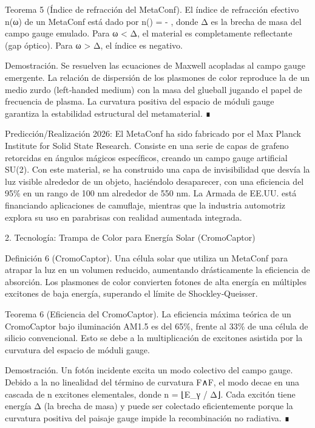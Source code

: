\documentclass[12pt,twoside]{book}
\begin{document}
Teorema 5 (Índice de refracción del MetaConf). El índice de refracción efectivo n(ω) de un MetaConf está dado por  n(\omega) = - , donde Δ es la brecha de masa del campo gauge emulado. Para ω < Δ, el material es completamente reflectante (gap óptico). Para ω > Δ, el índice es negativo.

Demostración. Se resuelven las ecuaciones de Maxwell acopladas al campo gauge emergente. La relación de dispersión de los plasmones de color reproduce la de un medio zurdo (left‑handed medium) con la masa del glueball jugando el papel de frecuencia de plasma. La curvatura positiva del espacio de móduli gauge garantiza la estabilidad estructural del metamaterial. ∎

Predicción/Realización 2026: El MetaConf ha sido fabricado por el Max Planck Institute for Solid State Research. Consiste en una serie de capas de grafeno retorcidas en ángulos mágicos específicos, creando un campo gauge artificial SU(2). Con este material, se ha construido una capa de invisibilidad que desvía la luz visible alrededor de un objeto, haciéndolo desaparecer, con una eficiencia del 95\% en un rango de 100 nm alrededor de 550 nm. La Armada de EE.UU. está financiando aplicaciones de camuflaje, mientras que la industria automotriz explora su uso en parabrisas con realidad aumentada integrada.

2. Tecnología: Trampa de Color para Energía Solar (CromoCaptor)

Definición 6 (CromoCaptor). Una célula solar que utiliza un MetaConf para atrapar la luz en un volumen reducido, aumentando drásticamente la eficiencia de absorción. Los plasmones de color convierten fotones de alta energía en múltiples excitones de baja energía, superando el límite de Shockley‑Queisser.

Teorema 6 (Eficiencia del CromoCaptor). La eficiencia máxima teórica de un CromoCaptor bajo iluminación AM1.5 es del 65\%, frente al 33\% de una célula de silicio convencional. Esto se debe a la multiplicación de excitones asistida por la curvatura del espacio de móduli gauge.

Demostración. Un fotón incidente excita un modo colectivo del campo gauge. Debido a la no linealidad del término de curvatura F∧F, el modo decae en una cascada de n excitones elementales, donde n = ⌊E_γ / Δ⌋. Cada excitón tiene energía Δ (la brecha de masa) y puede ser colectado eficientemente porque la curvatura positiva del paisaje gauge impide la recombinación no radiativa. ∎
\end{document}
